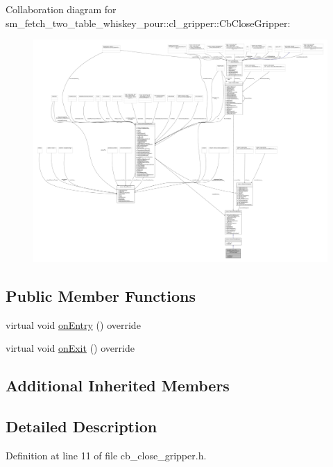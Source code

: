 Collaboration diagram for sm\+\_\+fetch\+\_\+two\+\_\+table\+\_\+whiskey\+\_\+pour\+:\+:cl\+\_\+gripper\+:\+:Cb\+Close\+Gripper\+:
\nopagebreak
\begin{figure}[H]
\begin{center}
\leavevmode
\includegraphics[width=350pt]{classsm__fetch__two__table__whiskey__pour_1_1cl__gripper_1_1CbCloseGripper__coll__graph}
\end{center}
\end{figure}
\subsection*{Public Member Functions}
\begin{DoxyCompactItemize}
\item 
virtual void \hyperlink{classsm__fetch__two__table__whiskey__pour_1_1cl__gripper_1_1CbCloseGripper_acbc50aeab65aa2fa0374feaf34d8009f}{on\+Entry} () override
\item 
virtual void \hyperlink{classsm__fetch__two__table__whiskey__pour_1_1cl__gripper_1_1CbCloseGripper_addead20a2d5c39561febe273843f189c}{on\+Exit} () override
\end{DoxyCompactItemize}
\subsection*{Additional Inherited Members}


\subsection{Detailed Description}


Definition at line 11 of file cb\+\_\+close\+\_\+gripper.\+h.



